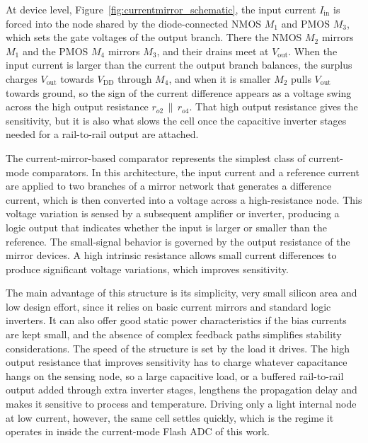 At device level, Figure~\ref{fig:currentmirror_schematic}, the input current $I_\mathrm{in}$ is forced into the node shared by the diode-connected NMOS $M_1$ and PMOS $M_3$, which sets the gate voltages of the output branch. There the NMOS $M_2$ mirrors $M_1$ and the PMOS $M_4$ mirrors $M_3$, and their drains meet at $V_\mathrm{out}$. When the input current is larger than the current the output branch balances, the surplus charges $V_\mathrm{out}$ towards $V_\mathrm{DD}$ through $M_4$, and when it is smaller $M_2$ pulls $V_\mathrm{out}$ towards ground, so the sign of the current difference appears as a voltage swing across the high output resistance $r_{o2}\,\|\,r_{o4}$. That high output resistance gives the sensitivity, but it is also what slows the cell once the capacitive inverter stages needed for a rail-to-rail output are attached.

The current-mirror-based comparator represents the simplest class of current-mode comparators. In this architecture, the input current and a reference current are applied to two branches of a mirror network that generates a difference current, which is then converted into a voltage across a high-resistance node. This voltage variation is sensed by a subsequent amplifier or inverter, producing a logic output that indicates whether the input is larger or smaller than the reference. The small-signal behavior is governed by the output resistance of the mirror devices. A high intrinsic resistance allows small current differences to produce significant voltage variations, which improves sensitivity.

The main advantage of this structure is its simplicity, very small silicon area and low design effort, since it relies on basic current mirrors and standard logic inverters. It can also offer good static power characteristics if the bias currents are kept small, and the absence of complex feedback paths simplifies stability considerations. The speed of the structure is set by the load it drives. The high output resistance that improves sensitivity has to charge whatever capacitance hangs on the sensing node, so a large capacitive load, or a buffered rail-to-rail output added through extra inverter stages, lengthens the propagation delay and makes it sensitive to process and temperature. Driving only a light internal node at low current, however, the same cell settles quickly, which is the regime it operates in inside the current-mode Flash ADC of this work.

